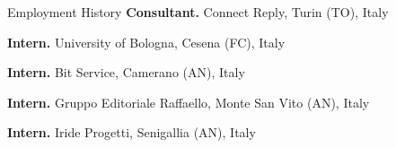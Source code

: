 \begin{rubric}{Employment History}
\entry*[2024..now]%
	\textbf{Consultant.} Connect Reply, Turin (TO), Italy

\entry*[2021]%
	\textbf{Intern.} University of Bologna, Cesena (FC), Italy

\entry*[2017]%
	\textbf{Intern.} Bit Service, Camerano (AN), Italy

\entry*[2017]%
	\textbf{Intern.} Gruppo Editoriale Raffaello, Monte San Vito (AN), Italy

\entry*[2016]%
	\textbf{Intern.} Iride Progetti, Senigallia (AN), Italy
%
\end{rubric}